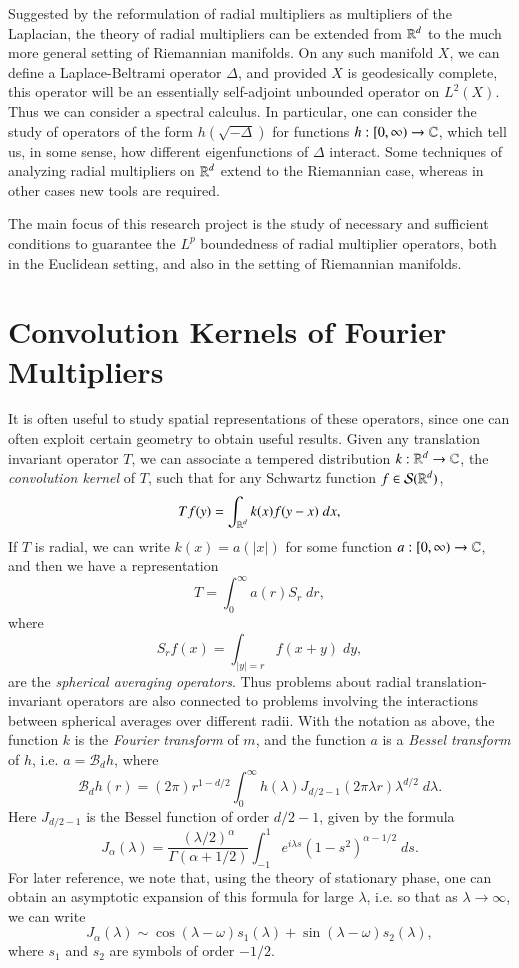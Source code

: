 Suggested by the reformulation of radial multipliers as multipliers of the Laplacian, the theory of radial multipliers can be extended from $\operatorname{\mathbb{R}}^d$ to the much more general setting of Riemannian manifolds. On any such manifold $X$, we can define a Laplace-Beltrami operator $\Delta$, and provided $X$ is geodesically complete, this operator will be an essentially self-adjoint unbounded operator on $L^2(X)$. Thus we can consider a spectral calculus. In particular, one can consider the study of operators of the form $h(\sqrt{-\Delta})$ for functions $h: [0,\infty) \to \operatorname{\mathbb{C}}$, which tell us, in some sense, how different eigenfunctions of  $\Delta$ interact. Some techniques of analyzing radial multipliers on $\operatorname{\mathbb{R}}^d$ extend to the Riemannian case, whereas in other cases new tools are required.

The main focus of this research project is the study of necessary and sufficient conditions to guarantee the $L^p$ boundedness of radial multiplier operators, both in the Euclidean setting, and also in the setting of Riemannian manifolds. %


\section{Convolution Kernels of Fourier Multipliers}

It is often useful to study spatial representations of these operators, since one can often exploit certain geometry to obtain useful results. Given any translation invariant operator $T$, we can associate a tempered distribution $k: \operatorname{\mathbb{R}}^d \to \operatorname{\mathbb{C}}$, the \emph{convolution kernel} of $T$, such that for any Schwartz function $f \in \mathcal{S}(\operatorname{\mathbb{R}}^d)$,
%
\[ Tf(y) = \int_{\operatorname{\mathbb{R}}^d} k(x) f(y-x)\; dx, \]
%
If $T$ is radial, we can write $k(x) = a(|x|)$ for some function $a: [0,\infty) \to \operatorname{\mathbb{C}}$, and then we have a representation
%
\[ T = \int_0^\infty a(r) S_r\; dr, \]
%
where
%
\[ S_rf(x) = \int_{|y| = r} f(x + y)\; dy, \]
%
are the \emph{spherical averaging operators}. Thus problems about radial translation-invariant operators are also connected to problems involving the interactions between spherical averages over different radii. With the notation as above, the function $k$ is the \emph{Fourier transform} of $m$, and the function $a$ is a \emph{Bessel transform} of $h$, i.e. $a = \mathcal{B}_d h$, where
%
\[ \mathcal{B}_d h(r) = (2 \pi) r^{1-d/2} \int_0^\infty h(\lambda) J_{d/2 - 1}(2 \pi \lambda r) \lambda^{d/2}\; d\lambda. \]
%
Here $J_{d/2-1}$ is the Bessel function of order $d/2 - 1$, given by the formula
%
\[ J_\alpha(\lambda) = \frac{(\lambda / 2)^\alpha}{\Gamma(\alpha + 1/2)} \int_{-1}^1 e^{i \lambda s} (1 - s^2)^{\alpha - 1/2}\; ds. \]
%
For later reference, we note that, using the theory of stationary phase, one can obtain an asymptotic expansion of this formula for large $\lambda$, i.e. so that as $\lambda \to \infty$, we can write
%
\[ J_\alpha(\lambda) \sim \cos(\lambda - \omega) s_1(\lambda) + \sin(\lambda - \omega) s_2(\lambda), \]
%
where $s_1$ and $s_2$ are symbols of order $-1/2$.


